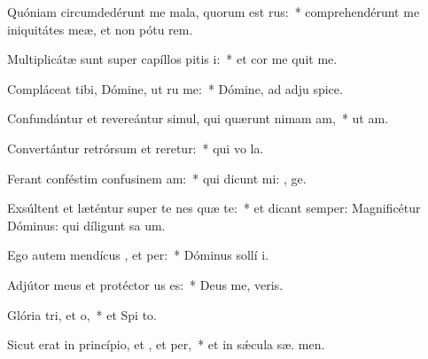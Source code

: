 \item Quóniam circumdedérunt me mala, quorum  est rus:~* comprehendérunt me iniquitátes meæ, et non pótu  rem.
\item Multiplicátæ sunt super capíllos pitis i:~* et cor me quit me.
\item Compláceat tibi, Dómine, ut ru me:~* Dómine, ad adju  spice.
\item Confundántur et revereántur simul, qui quærunt nimam am,~* ut  am.
\item Convertántur retrórsum et reretur:~* qui vo  la.
\item Ferant conféstim confusinem am:~* qui dicunt mi: , ge.
\item Exsúltent et læténtur super te nes quæ te:~* et dicant semper: Magnificétur Dóminus: qui díligunt sa um.
\item Ego autem mendícus , et per:~* Dóminus sollí  i.
\item Adjútor meus et protéctor us  es:~* Deus me,  veris.
\item Glória tri, et o,~* et Spi to.
\item Sicut erat in princípio, et , et per,~* et in sǽcula sæ. men.

